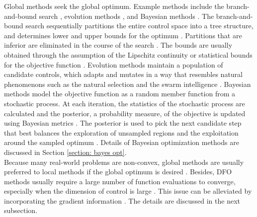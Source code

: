 Global methods seek the global optimum. 
Example methods include the branch-and-bound search \cite{Branch and Bound}, evolution methods \cite{evolution review}, and 
Bayesian methods \cite{practical Bayesian, Locatelli, prob of improve}. 
The branch-and-bound search sequentially partitions the entire control space into a tree structure, and
determines lower and upper bounds for the optimum
\cite{Branch and Bound}. Partitions that are inferior are eliminated 
in the course of the search \cite{Branch and Bound}. The bounds are usually obtained through the assumption of the
Lipschitz continuity or statistical bounds for the objective function \cite{Branch and Bound}. 
Evolution methods maintain a population
of candidate controls, which adapts and mutates in a way that resembles natural phenomenons
such as the natural selection \cite{genetic algo, cuckoo} 
and the swarm intelligence \cite{particle swarm}.
Bayesian methods model the objective function as a random member function from a stochastic process.
At each iteration, the statistics of the stochastic process are calculated 
and the posterior, a probability measure, of the objective 
is updated using Bayesian metrics \cite{practical Bayesian, review EI}. 
The posterior is used to pick the next candidate step
that best balances the exploration of unsampled regions and the exploitation around the sampled
optimum \cite{Locatelli, jones1998, GP bandit}. Details of Bayesian optimization methods are discussed in Section \ref{section: bayes opt}.\\

Because many real-world problems are non-convex, global methods are usually preferred to local methods
if the global optimum is desired \cite{gradfreereview}. Besides, DFO methods usually require
a large number of function evaluations to converge, especially when the dimension of control is large
\cite{gradfreereview}. This issue can be alleviated by incorporating the gradient information
\cite{derivative RKHS, grad coKriging, grad particle swarm, grad cuckoo}.
The details are discussed in the next subsection.\\

